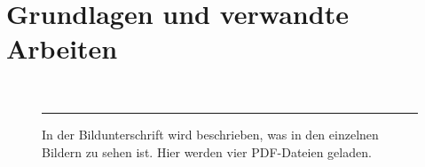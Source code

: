 
\chapter{Grundlagen und verwandte Arbeiten}
\label{cha:related_work}

\blindmathtrue
\Blindtext

\begin{figure}[h!]
\centering
{}
\quad\quad\quad
{}
\\
\quad\quad\quad
{}
\vspace{2mm}
\hrule
\caption{In der Bildunterschrift wird beschrieben, was in den einzelnen Bildern zu sehen ist. Hier werden vier PDF-Dateien geladen.}
\label{fig:figID}
\end{figure}


